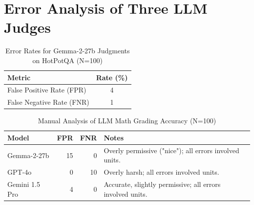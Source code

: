 \documentclass{article} %
\begin{document}
\newpage\section{Error Analysis of Three LLM Judges}\label{sec:error-analysis}

\begin{table}[htbp] %
    \centering %
    \caption{Error Rates for Gemma-2-27b Judgments on HotPotQA (N=100)}
    \label{tab:gemma2_hotpotqa_rates} %
    \begin{tabular}{l S[table-format=2.2]} %
        \toprule %
        Metric & {Rate (\%)} \\ %
        \midrule %
        False Positive Rate (FPR) & 4 \\
        False Negative Rate (FNR) & 1 \\
        \bottomrule %
    \end{tabular}
\end{table}


\begin{table}[htbp]
    \centering
    \caption{Manual Analysis of LLM Math Grading Accuracy (N=100)}
    \label{tab:llm_math_grading_analysis_narrow} %
    \begin{tabular}{l r r p{4.5cm}}
        \toprule
        Model           & FPR & FNR & Notes \\ %
        \midrule
        Gemma-2-27b       & 15  & 0   & Overly permissive ("nice"); all errors involved units. \\
        GPT-4o          & 0   & 10  & Overly harsh; all errors involved units. \\
        Gemini 1.5 Pro  & 4   & 0   & Accurate, slightly permissive; all errors involved units. \\
        \bottomrule
    \end{tabular}
\end{table}
\end{document}
